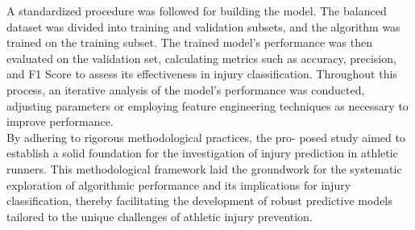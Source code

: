 \documentclass[12pt, English]{article}
\newcommand\tab[1][1cm]{\hspace*{#1}}
\begin{document}
\begin{normalsize}
\tab A standardized procedure was followed for building the                model. The balanced dataset was divided into training and validation subsets, and the algorithm was trained on the training subset. The trained model’s performance was then evaluated on the validation set, calculating metrics such as accuracy, precision, and F1 Score to assess its effectiveness in injury classification. Throughout this process, an iterative analysis of the model’s performance was conducted, adjusting parameters or employing feature engineering techniques as necessary to improve performance.\\

\tab By adhering to rigorous methodological practices, the pro- posed study aimed to establish a solid foundation for the investigation of injury prediction in athletic runners. This methodological framework laid the groundwork for the systematic exploration of algorithmic performance and its implications for injury classification, thereby facilitating the development of robust predictive models tailored to the unique challenges of athletic injury prevention.\\

\tab


\newpage
\begin{center}

\end{center}
\end{normalsize}
\end{document}

